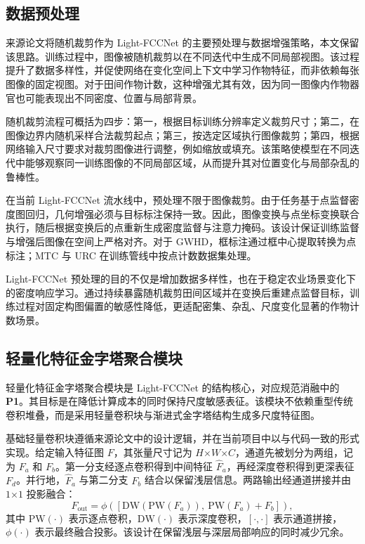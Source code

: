 \documentclass[a4paper,fleqn]{cas-sc}
\begin{document}
\subsection{数据预处理}

来源论文将随机裁剪作为 Light-FCCNet 的主要预处理与数据增强策略，本文保留该思路。训练过程中，图像被随机裁剪以在不同迭代中生成不同局部视图。该过程提升了数据多样性，并促使网络在变化空间上下文中学习作物特征，而非依赖每张图像的固定视图。对于田间作物计数，这种增强尤其有效，因为同一图像内作物器官也可能表现出不同密度、位置与局部背景。

随机裁剪流程可概括为四步：第一，根据目标训练分辨率定义裁剪尺寸；第二，在图像边界内随机采样合法裁剪起点；第三，按选定区域执行图像裁剪；第四，根据网络输入尺寸要求对裁剪图像进行调整，例如缩放或填充。该策略使模型在不同迭代中能够观察同一训练图像的不同局部区域，从而提升其对位置变化与局部杂乱的鲁棒性。

在当前 Light-FCCNet 流水线中，预处理不限于图像裁剪。由于任务基于点监督密度图回归，几何增强必须与目标标注保持一致。因此，图像变换与点坐标变换联合执行，随后根据变换后的点重新生成密度监督与注意力掩码。该设计保证训练监督与增强后图像在空间上严格对齐。对于 GWHD，框标注通过框中心提取转换为点标注；MTC 与 URC 在训练管线中按点计数数据集处理。

Light-FCCNet 预处理的目的不仅是增加数据多样性，也在于稳定农业场景变化下的密度响应学习。通过持续暴露随机裁剪田间区域并在变换后重建点监督目标，训练过程对固定构图偏置的敏感性降低，更适配密集、杂乱、尺度变化显著的作物计数场景。

\subsection{轻量化特征金字塔聚合模块}

轻量化特征金字塔聚合模块是 Light-FCCNet 的结构核心，对应规范消融中的 \textbf{P1}。其目标是在降低计算成本的同时保持尺度敏感表征。该模块不依赖重型传统卷积堆叠，而是采用轻量卷积块与渐进式金字塔结构生成多尺度特征图。

基础轻量卷积块遵循来源论文中的设计逻辑，并在当前项目中以与代码一致的形式实现。给定输入特征图 $F$，其张量尺寸记为 $H\text{×}W\text{×}C$，通道先被划分为两组，记为 $F_a$ 和 $F_b$。第一分支经逐点卷积得到中间特征 $\hat{F}_a$，再经深度卷积得到更深表征 $F_d$。并行地，$\hat{F}_a$ 与第二分支 $F_b$ 结合以保留浅层信息。两路输出经通道拼接并由 $1\text{×}1$ 投影融合：
\begin{equation}
    F_{\mathrm{out}} = \phi\left([\mathrm{DW}(\mathrm{PW}(F_a)),\ \mathrm{PW}(F_a) + F_b]\right),
\end{equation}
其中 $\mathrm{PW}(\cdot)$ 表示逐点卷积，$\mathrm{DW}(\cdot)$ 表示深度卷积，$[\cdot,\cdot]$ 表示通道拼接，$\phi(\cdot)$ 表示最终融合投影。该设计在保留浅层与深层局部响应的同时减少冗余。
\end{document}
